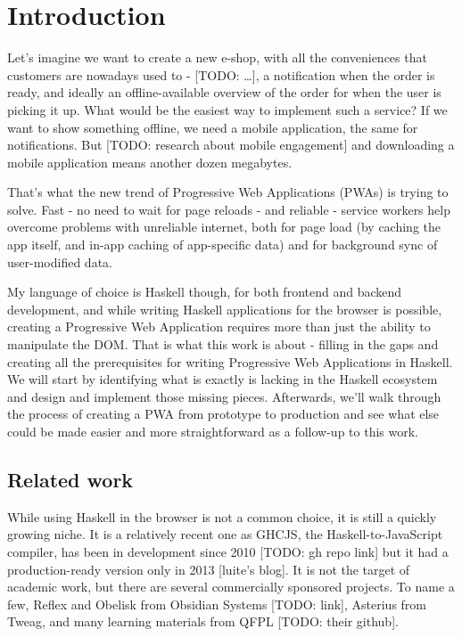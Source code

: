 \documentclass[english,odsaz]{fitthesis}
\date{\today}
\title{}
\begin{document}
\maketitle
\setlength{\parskip}{0pt}
{\hypersetup{hidelinks}\tableofcontents}
\iftotalfigures\listoffigures\fi
\iftotaltables\listoftables\fi
\iftwoside\cleardoublepage\fi
\setlength{\parskip}{0.5\bigskipamount}

\chapter{Introduction}
\label{sec:orgd732d26}
Let's imagine we want to create a new e-shop, with all the conveniences that
customers are nowadays used to - [TODO: \ldots{}], a notification when the order is
ready, and ideally an offline-available overview of the order for when the user
is picking it up. What would be the easiest way to implement such a service? If
we want to show something offline, we need a mobile application, the same for
notifications. But [TODO: research about mobile engagement] and downloading a
mobile application means another dozen megabytes.

That's what the new trend of Progressive Web Applications (PWAs) is trying to
solve. Fast - no need to wait for page reloads - and reliable - service workers help
overcome problems with unreliable internet, both for page load (by caching the
app itself, and in-app caching of app-specific data) and for background sync of
user-modified data.

My language of choice is Haskell though, for both frontend and backend
development, and while writing Haskell applications for the browser is possible,
creating a Progressive Web Application requires more than just the ability to
manipulate the DOM. That is what this work is about - filling in the gaps and
creating all the prerequisites for writing Progressive Web Applications in
Haskell. We will start by identifying what is exactly is lacking in the Haskell
ecosystem and design and implement those missing pieces. Afterwards, we'll walk
through the process of creating a PWA from prototype to production and see what
else could be made easier and more straightforward as a follow-up to this work.

\section{Related work}
\label{sec:org32bb698}
While using Haskell in the browser is not a common choice, it is still a quickly
growing niche. It is a relatively recent one as GHCJS, the Haskell-to-JavaScript
compiler, has been in development since 2010 [TODO: gh repo link] but it had a
production-ready version only in 2013 [luite's blog]. It is not the target of
academic work, but there are several commercially sponsored projects. To name a
few, Reflex and Obelisk from Obsidian Systems [TODO: link], Asterius from Tweag,
and many learning materials from QFPL [TODO: their github].
\end{document}
